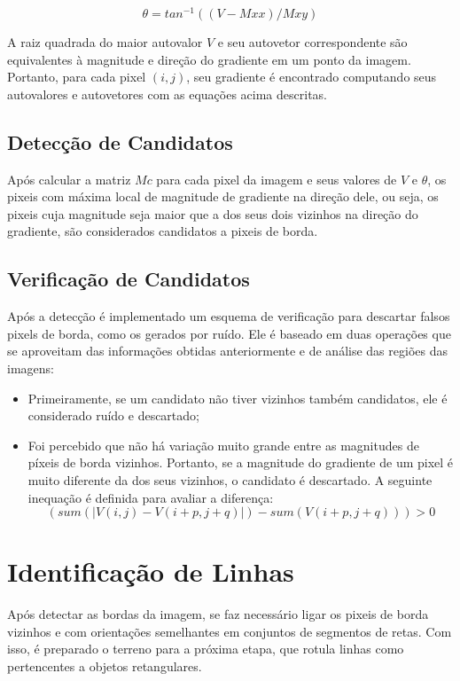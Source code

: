 $$ \theta = tan^{-1}((V-Mxx)/Mxy) $$

A raiz quadrada do maior autovalor $V$ e seu autovetor correspondente são equivalentes à magnitude e direção do gradiente em um ponto da imagem. Portanto, para cada pixel $(i,j)$, seu gradiente é encontrado computando seus autovalores e autovetores com as equações acima descritas.

\subsection{Detecção de Candidatos}

Após calcular a matriz $Mc$ para cada pixel da imagem e seus valores de $V$ e $\theta$, os pixeis com máxima local de magnitude de gradiente na direção dele, ou seja, os pixeis cuja magnitude seja maior que a dos seus dois vizinhos na direção do gradiente, são considerados candidatos a pixeis de borda.

\subsection{Verificação de Candidatos}

Após a detecção é implementado um esquema de verificação para descartar falsos pixels de borda, como os gerados por ruído. Ele é baseado em duas operações que se aproveitam das informações obtidas anteriormente e de análise das regiões das imagens:

\begin{itemize}
\item Primeiramente, se um candidato não tiver vizinhos também candidatos, ele é considerado ruído e descartado;
\item Foi percebido que não há variação muito grande entre as magnitudes de píxeis de borda vizinhos. Portanto, se a magnitude do gradiente de um pixel é muito diferente da dos seus vizinhos, o candidato é descartado. A seguinte inequação é definida para avaliar a diferença:
$$ (sum(| V(i,j) - V(i+p,j+q) |)- sum(V(i+p,j+q))) >0$$
\end {itemize}

\section{Identificação de Linhas}

Após detectar as bordas da imagem, se faz necessário ligar os pixeis de borda vizinhos e com orientações semelhantes em conjuntos de segmentos de retas. Com isso, é preparado o terreno para a próxima etapa, que rotula linhas como pertencentes a objetos retangulares. 

